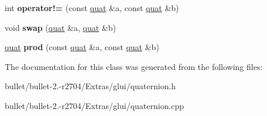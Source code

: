 \begin{DoxyCompactItemize}
\item 
\hypertarget{classquat_a76b6b58902bf431c7c193e1720b0b182}{int {\bfseries operator!=} (const \hyperlink{classquat}{quat} \&a, const \hyperlink{classquat}{quat} \&b)}\label{classquat_a76b6b58902bf431c7c193e1720b0b182}

\item 
\hypertarget{classquat_a465e9ab76658bed899ad8095a17647c0}{void {\bfseries swap} (\hyperlink{classquat}{quat} \&a, \hyperlink{classquat}{quat} \&b)}\label{classquat_a465e9ab76658bed899ad8095a17647c0}

\item 
\hypertarget{classquat_a788864b84ce05a4c86cbd7edcd5adb24}{\hyperlink{classquat}{quat} {\bfseries prod} (const \hyperlink{classquat}{quat} \&a, const \hyperlink{classquat}{quat} \&b)}\label{classquat_a788864b84ce05a4c86cbd7edcd5adb24}

\end{DoxyCompactItemize}


The documentation for this class was generated from the following files\+:\begin{DoxyCompactItemize}
\item 
bullet/bullet-\/2.-\/r2704/\+Extras/glui/quaternion.\+h\item 
bullet/bullet-\/2.-\/r2704/\+Extras/glui/quaternion.\+cpp\end{DoxyCompactItemize}
